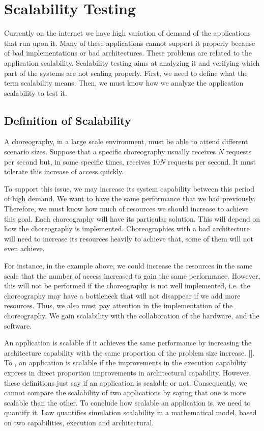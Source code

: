 \section{Scalability Testing}
\label{scalabilityTesting}

Currently on the internet we have high variation of demand of the applications that run upon it. Many of these applications cannot support it properly because of bad implementations or bad architectures. These problems are related to the application scalability. Scalability testing aims at analyzing it and verifying which part of the systems are not scaling properly. First, we need to define what the term scalability means. Then, we must know how we analyze the application scalability to test it. 

\subsection{Definition of Scalability}
A choreography, in a large scale environment, must be able to attend different scenario sizes. Suppose that a specific choreography usually receives $N$ requests per second but, in some specific times, receives $10N$ requests per second. It must tolerate this increase of access quickly.

To support this issue, we may increase its system capability between this period of high demand. We want to have the same performance that we had previously. Therefore, we must know how much of resources we should increase to achieve this goal.  Each choreography will have its particular solution. This will depend on how the choreography is implemented. Choreographies with a bad architecture will need to increase its resources heavily to achieve that, some of them will not even achieve.

For instance, in the example above, we could increase the resources in the same scale that the number of access increased to gain the same performance. However, this will not be performed if the choreography is not well implemented, i.e.  the choreography may have a bottleneck that will not disappear if we add more resources. Thus, we also must pay attention in the implementation of the choreography. We gain scalability with the collaboration of the hardware, and the software. 

An application is scalable if it achieves the same performance by increasing the architecture capability with the same proportion of the problem size increase. [\citet{QUINN}]. To \citet{LAW}, an application is scalable if the improvements in the execution capability express in direct proportion improvements in architectural capability. However, these definitions just say if an application is scalable or not. Consequently, we cannot compare the scalability of two applications by saying that one is more scalable than the other. To conclude how scalable an application is, we need to quantify it. Law quantifies simulation scalability in a mathematical model, based on two capabilities, execution and architectural. 


